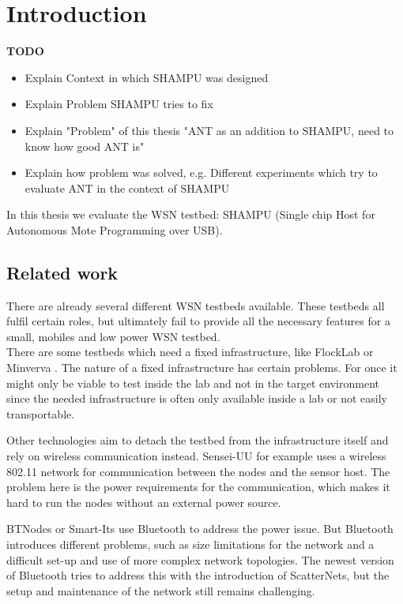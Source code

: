 \chapter{Introduction}
\label{sec:intro}
\textbf{TODO}
\begin{itemize}
	\item{Explain Context in which SHAMPU was designed}
	\item{Explain Problem SHAMPU tries to fix}
	\item{Explain "Problem" of this thesis "ANT as an addition to SHAMPU, need to know how good ANT is"}
	\item{Explain how problem was solved, e.g. Different experiments which try to evaluate ANT in the context of SHAMPU}
\end{itemize}
In this thesis we evaluate the WSN testbed: SHAMPU (Single chip Host for Autonomous Mote Programming over USB). 


\section{Related work}
\label{sec:related_work}

There are already several different WSN testbeds available. These testbeds all fulfil certain roles, but ultimately fail to provide all the necessary features for a small, mobiles and low power WSN testbed.\\

There are some testbeds which need a fixed infrastructure, like FlockLab \cite{Lim2013} or Minverva \cite{Sommer}. The nature of a fixed infrastructure has certain problems. For once it might only be  viable to test inside the lab and not in the target environment since the needed infrastructure is often only available inside a lab or not easily transportable. 

Other technologies aim to detach the testbed from the infrastructure itself and rely on wireless communication instead. Sensei-UU \cite{Rensfelt2009} for example uses a wireless 802.11 network for communication between the nodes and the sensor host. The problem here is the power requirements for the communication, which makes it hard to run the nodes without an external power source.

BTNodes \cite{Moser} or Smart-Its \cite{Kasten2000} use Bluetooth to address the power issue. But Bluetooth introduces different problems, such as size limitations for the network and a difficult set-up and use of more complex network topologies. The newest version of Bluetooth tries to address this with the introduction of ScatterNets, but the setup and maintenance of the network still remains challenging.

